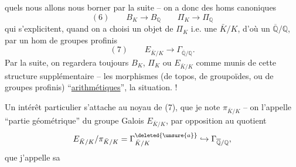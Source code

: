 quels nous allons nous borner par la suite -- on a donc des homs canoniques
\[
(6)\qquad B_K\longrightarrow B_{\mathbb Q}\qquad\Pi_K\longrightarrow\Pi_{\mathbb Q}
\]
qui s'explicitent, quand on a choisi un objet de $\Pi_K$ i.e. une $\bar K/K$, d'où un $\overline{\mathbb Q}/\mathbb Q$, par un hom de groupes profinis
\[
(7)\qquad E_{\bar K/K}\longrightarrow\Gamma_{\overline{\mathbb Q}/\mathbb Q}.
\]
Par la suite, on regardera toujours $B_K$, $\Pi_K$ ou $E_{\bar K/K}$ comme munis de cette structure supplémentaire --  les morphismes (de topos, de groupoïdes, ou de groupes profinis) ``\uline{arithmétiques}'',  la situation. !

Un intérêt particulier s'attache au noyau de (7), que je note $\pi_{\bar K/K}$ -- on l'appelle ``partie géométrique'' du groupe Galois $E_{\bar K/K}$, par opposition au quotient
\[
E_{\bar K/K}/\pi_{\bar K/K}=\Gamma^{\deleted{\unsure{a}}}_{\bar K/K}\hookrightarrow\Gamma_{\overline{\mathbb Q}/\mathbb Q},
\]
que j'appelle sa
